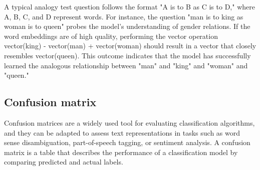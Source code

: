 A typical analogy test question follows the format "A is to B as C is to D," where A, B, C, and D represent words.
For instance, the question "man is to king as woman is to queen" probes the model's understanding of gender relations.
If the word embeddings are of high quality, performing the vector operation vector(king) - vector(man) + vector(woman) should result in a vector that closely resembles vector(queen).
This outcome indicates that the model has successfully learned the analogous relationship between "man" and "king" and "woman" and "queen."

\subsection{Confusion matrix}

Confusion matrices are a widely used tool for evaluating classification algorithms, and they can be adapted to assess text representations in tasks such as word sense disambiguation, part-of-speech tagging, or sentiment analysis.
A confusion matrix is a table that describes the performance of a classification model by comparing predicted and actual labels.




